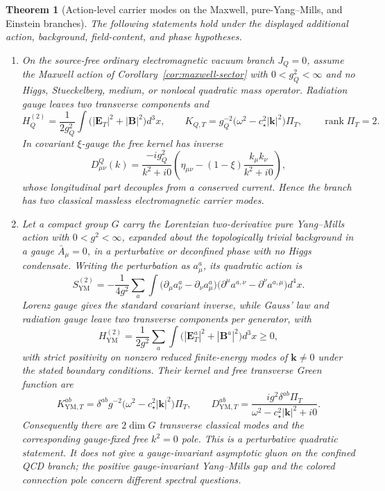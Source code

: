 \documentclass[11pt]{article}
\newtheorem{theorem}{Theorem}[section]
\begin{document}
\begin{theorem}[Action-level carrier modes on the Maxwell, pure-Yang--Mills, and Einstein branches]
\label{thm:carrier-mode-gates}
The following statements hold under the displayed additional action, background, field-content,
and phase hypotheses.
\begin{enumerate}[label=\textup{(\roman*)},leftmargin=2em]
\item On the source-free ordinary electromagnetic vacuum branch \(J_Q=0\), assume the Maxwell action of
Corollary~\ref{cor:maxwell-sector} with \(0<g_Q^2<\infty\) and no Higgs, Stueckelberg, medium, or
nonlocal quadratic mass operator. Radiation gauge leaves two transverse components and
\[
H_Q^{(2)}=\frac{1}{2g_Q^2}\int
\bigl(|\mathbf E_T|^2+|\mathbf B|^2\bigr)d^3x,
\qquad
K_{Q,T}=g_Q^{-2}
\bigl(\omega^2-c_\star^2|\mathbf k|^2\bigr)\Pi_T,
\qquad \operatorname{rank}\Pi_T=2.
\]
In covariant \(\xi\)-gauge the free kernel has inverse
\[
D^Q_{\mu\nu}(k)
=\frac{-ig_Q^2}{k^2+i0}
\left(\eta_{\mu\nu}-(1-\xi)\frac{k_\mu k_\nu}{k^2+i0}\right),
\]
whose longitudinal part decouples from a conserved current. Hence the branch has two classical
massless electromagnetic carrier modes.

\item Let a compact group \(G\) carry the Lorentzian two-derivative pure Yang--Mills action with
\(0<g^2<\infty\), expanded about the topologically trivial background in a gauge
\(\bar A_\mu=0\), in a perturbative or deconfined phase with no Higgs condensate. Writing the
perturbation as \(a_\mu^a\), its quadratic action is
\[
S_{\mathrm{YM}}^{(2)}
=-\frac{1}{4g^2}\sum_a\int
\bigl(\partial_\mu a_\nu^a-\partial_\nu a_\mu^a\bigr)
\bigl(\partial^\mu a^{a,\nu}-\partial^\nu a^{a,\mu}\bigr)d^4x.
\]
Lorenz gauge gives the standard covariant inverse, while Gauss' law and radiation gauge leave two
transverse components per generator, with
\[
H_{\mathrm{YM}}^{(2)}
=\frac{1}{2g^2}\sum_a\int
\bigl(|\mathbf E_T^a|^2+|\mathbf B^a|^2\bigr)d^3x\geq0,
\]
with strict positivity on nonzero reduced finite-energy modes of
\(\mathbf k\neq0\) under the stated boundary conditions. Their kernel and free transverse Green
function are
\[
K^{ab}_{\mathrm{YM},T}
=\delta^{ab}g^{-2}
\bigl(\omega^2-c_\star^2|\mathbf k|^2\bigr)\Pi_T,
\qquad
D^{ab}_{\mathrm{YM},T}
=\frac{i g^2\delta^{ab}\Pi_T}
{\omega^2-c_\star^2|\mathbf k|^2+i0}.
\]
Consequently there are \(2\dim G\) transverse classical modes and the corresponding gauge-fixed
free \(k^2=0\) pole. This is a perturbative quadratic statement. It does not give a gauge-invariant
asymptotic gluon on the confined QCD branch; the positive gauge-invariant Yang--Mills gap and the
colored connection pole concern different spectral questions.


\end{enumerate}
\end{theorem}
\end{document}
